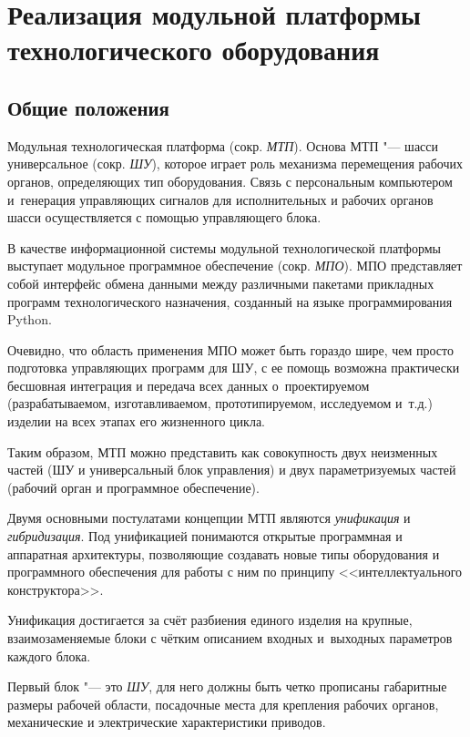 \chapter{Реализация модульной платформы технологического оборудования}\label{ch:ch4}

\section{Общие положения}

Модульная технологическая платформа (сокр. \textit{МТП}). Основа МТП "--- шасси универсальное (сокр. \textit{ШУ}), которое играет роль механизма перемещения рабочих органов, определяющих тип оборудования. Связь с персональным компьютером и~генерация управляющих сигналов для исполнительных и рабочих органов шасси осуществляется с помощью управляющего блока.

В качестве информационной системы модульной технологической платформы выступает модульное программное обеспечение (сокр. \textit{МПО}). МПО представляет собой интерфейс обмена данными между различными пакетами прикладных программ технологического назначения, созданный на языке программирования Python.

Очевидно, что область применения МПО может быть гораздо шире, чем просто подготовка управляющих программ для ШУ, с ее помощь возможна практически бесшовная интеграция и передача всех данных о~проектируемом (разрабатываемом, изготавливаемом, прототипируемом, исследуемом и~т.\:д.) изделии на всех этапах его жизненного цикла.

Таким образом, МТП можно представить как совокупность двух неизменных частей (ШУ и универсальный блок управления) и двух параметризуемых частей (рабочий орган и программное обеспечение).

Двумя основными постулатами концепции МТП являются \textit{унификация} и \textit{гибридизация}. Под унификацией понимаются открытые программная и аппаратная архитектуры, позволяющие создавать новые типы оборудования и программного обеспечения для работы с ним по принципу <<интеллектуального конструктора>>.

Унификация достигается за счёт разбиения единого изделия на крупные, взаимозаменяемые блоки с чётким описанием входных и~выходных параметров каждого блока.

Первый блок "--- это \textit{ШУ}, для него должны быть четко прописаны габаритные размеры рабочей области, посадочные места для крепления рабочих органов, механические и электрические характеристики приводов.


